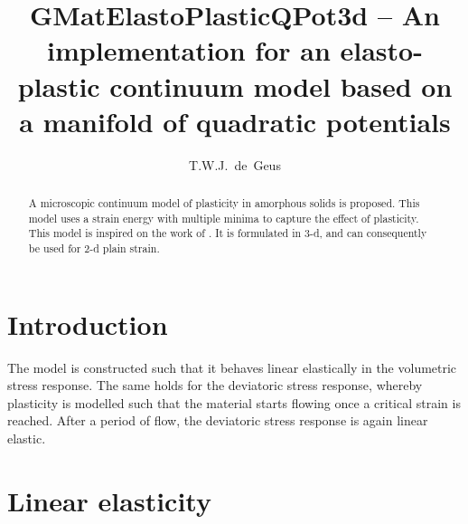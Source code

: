 \documentclass[times,namecite]{goose-article}
\title{%
  GMatElastoPlasticQPot3d -- An implementation for an elasto-plastic continuum model based on a manifold of quadratic potentials
}
\author{T.W.J.~de~Geus}
\begin{document}
\maketitle

\begin{abstract}
A microscopic continuum model of plasticity in amorphous solids is proposed. This model uses a strain energy with multiple minima to capture the effect of plasticity. This model is inspired on the work of \citet{Jagla2017}. It is formulated in 3-d, and can consequently be used for 2-d plain strain.
\end{abstract}


\setcounter{tocdepth}{3}
\tableofcontents

\vfill\newpage
\section{Introduction}

The model is constructed such that it behaves linear elastically in the volumetric stress response. The same holds for the deviatoric stress response, whereby plasticity is modelled such that the material starts flowing once a critical strain is reached. After a period of flow, the deviatoric stress response is again linear elastic.

\section{Linear elasticity}
\end{document}
